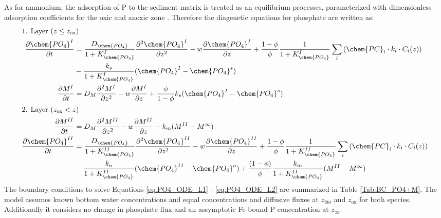 \documentclass[gmd, manuscript]{copernicus}
\begin{document}
As for ammonium, the adsorption of P to the sediment matrix is treated as an equilibrium processes, parameterized with dimensionless adsorption coefficients for the oxic and anoxic zone 
\citep[$K_{\chem{PO_4}}^I$, $K_{\chem{PO_4}}^{II}$][]{slomp1998role}. Therefore the diagenetic equations for phosphate are written as:
\begin{align}
\intertext{1. Layer ($z \leq z_{\mathrm{ox}}$)}
 \frac{\partial \chem{PO_4}^I}{\partial t} &= \frac{D_{\chem{PO_4}}}{1+K_{\chem{PO_4}}^I} \frac{\partial^2\chem{PO_4}^I }{\partial z^2} - w\frac{\partial \chem{PO_4}^I }{\partial z} + \frac{1-\phi}{\phi}\frac{1}{1+K_{\chem{PO_4}}^I}\sum_i 
					\left( \chem{PC}_i \cdot k_i \cdot C_{i}(z) \right) \notag\\
					& - \frac{k_{s}}{1+K_{\chem{PO_4}}^I}(\chem{PO_4}^I-\chem{PO_4}^s)\label{eq:PO4_ODE_L1}\\  %
 \frac{\partial M^I}{\partial t} &= D_{M}\frac{\partial^2M^I }{\partial z^2} - w\frac{\partial M^I }{\partial z} + \frac{\phi}{1-\phi}k_{s}(\chem{PO_4}^I-\chem{PO_4}^s)\label{eq:M_ODE_L1}\\  
 \intertext{2. Layer ($z_{\mathrm{ox}} < z$)} 
 \frac{\partial M^{II}}{\partial t} & = D_{M}\frac{\partial^2M^{II} }{\partial z^2} - w\frac{\partial M^{II} }{\partial z} - k_{m}(M^{II} - M^\infty)\label{eq:M_ODE_L2}\\  
 \frac{\partial \chem{PO_4}^{II}}{\partial t} &= \frac{D_{\chem{PO_4}}}{1+K_{\chem{PO_4}}^{II}} \frac{\partial^2\chem{PO_4}^{II} }{\partial z^2} - w\frac{\partial \chem{PO_4}^{II} }{\partial z} + \frac{1-\phi}{\phi} \frac{1}{1+K_{\chem{PO_4}}^{II}}\sum_i 
					\left( \chem{PC}_i \cdot k_i \cdot C_{i}(z) \right) \notag\\
					& - \frac{k_{a}}{1+K_{\chem{PO_4}}^{II}}(\chem{PO_4}^{II}-\chem{PO_4}^a) + \frac{(1-\phi)}{\phi}\frac{k_{m}}{1+K_{\chem{PO_4}}^{II}}(M^{II}-M^\infty)\label{eq:PO4_ODE_L2}\\
\end{align}
The boundary conditions to solve Equations \ref{eq:PO4_ODE_L1} - \ref{eq:PO4_ODE_L2} are summarized in Table \ref{Tab:BC_PO4+M}. 
The model assumes known bottom water concentrations and equal concentrations and diffusive fluxes at $z_{\mathrm{bio}}$ and $z_{\mathrm{ox}}$ for both species. 
Additionally it considers no change in phosphate flux and an assymptotic Fe-bound P concentration at $z_\infty$. \\
\end{document}
